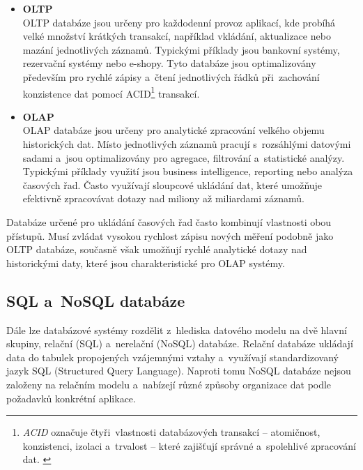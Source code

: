 \begin{itemize}
    \item \textbf{OLTP} \\
    OLTP databáze jsou určeny pro každodenní provoz aplikací, kde probíhá velké množství krátkých transakcí, například vkládání, aktualizace nebo mazání jednotlivých záznamů. 
    Typickými příklady jsou bankovní systémy, rezervační systémy nebo e-shopy. 
    Tyto databáze jsou optimalizovány především pro rychlé zápisy a~čtení jednotlivých řádků při~zachování konzistence dat pomocí ACID\footnote{\textit{ACID} označuje čtyři~vlastnosti databázových transakcí – atomičnost, konzistenci, izolaci a~trvalost – které zajišťují správné a~spolehlivé zpracování dat. \cite{mongodbacid}} transakcí.
    \cite{clickhouseoltpvsolap}

    \item \textbf{OLAP} \\
    OLAP databáze jsou určeny pro analytické zpracování velkého objemu historických dat. 
    Místo jednotlivých záznamů pracují s~rozsáhlými datovými sadami a~jsou optimalizovány pro agregace, filtrování a~statistické analýzy. 
    Typickými příklady využití jsou business intelligence, reporting nebo analýza časových řad. 
    Často využívají sloupcové ukládání dat, které umožňuje efektivně zpracovávat dotazy nad miliony až miliardami záznamů.
    \cite{clickhouseoltpvsolap}
\end{itemize}

Databáze určené pro ukládání časových řad často kombinují vlastnosti obou přístupů. 
Musí zvládat vysokou rychlost zápisu nových měření podobně jako OLTP databáze, současně však umožňují rychlé analytické dotazy nad historickými daty, které jsou charakteristické pro OLAP systémy.
\cite{clickhouseoltpvsolap}

\subsection{SQL a~NoSQL databáze}
Dále lze databázové systémy rozdělit z~hlediska datového modelu na dvě hlavní skupiny, relační (SQL) a~nerelační (NoSQL) databáze. 
Relační databáze ukládají data do tabulek propojených vzájemnými vztahy a~využívají standardizovaný jazyk SQL (Structured Query Language). 
Naproti tomu NoSQL databáze nejsou založeny na relačním modelu a~nabízejí různé způsoby organizace dat podle požadavků konkrétní aplikace.

